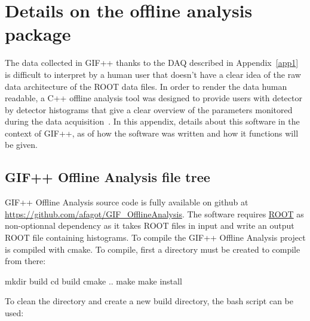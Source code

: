 \graphicspath{{chapt_dutch/}{intro/}{chapt2/}{chapt3/}{chapt4/}{chapt5/}{chapt6/}{chapt7/}}

\renewcommand\evenpagerightmark{{\scshape\small Appendix B}}
\renewcommand\oddpageleftmark{{\scshape\small Details on the online analysis package}}

\renewcommand{\bibname}{References}

\hyphenation{}

\chapter[Details on the offline analysis package]%
{Details on the offline analysis package}
\label{app2}

The data collected in GIF++ thanks to the DAQ described in Appendix~\ref{app1} is difficult to interpret by a human user that doesn't have a clear idea of the raw data architecture of the ROOT data files. In order to render the data human readable, a C++ offline analysis tool was designed to provide users with detector by detector histograms that give a clear overview of the parameters monitored during the data acquisition~\cite{GIFOffline}. In this appendix, details about this software in the context of GIF++, as of how the software was written and how it functions will be given.

\section{GIF++ Offline Analysis file tree}
\label{app2:sec:code}

	GIF++ Offline Analysis source code is fully available on github at \url{https://github.com/afagot/GIF_OfflineAnalysis}. The software requires \href{https://root.cern.ch/downloading-root}{ROOT} as non-optionnal dependency as it takes ROOT files in input and write an output ROOT file containing histograms. To compile the GIF++ Offline Analysis project is compiled with cmake. To compile, first a  directory must be created to compile from there:\\

	\begin{bashcode}
 mkdir build
 cd build
 cmake ..
 make
 make install
	\end{bashcode}
\vspace{5mm}
	To clean the directory and create a new build directory, the bash script  can be used:\\
	
